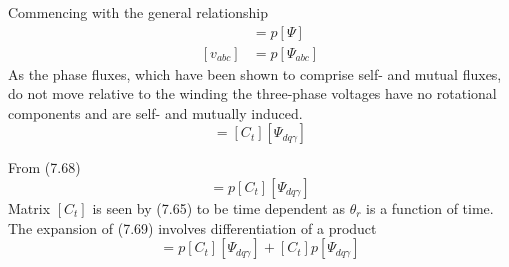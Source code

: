 \documentclass[a4paper,numbers=noenddot,12pt]{scrbook}
\begin{document}
    Commencing with the general relationship
    \begin{align}
        [v] & = p[\varPsi] \nonumber \\
        [v_{abc}] & = p [\varPsi_{abc}]
        \label{eq:Eq7.68}
    \end{align}
    As the phase fluxes, which have been shown to comprise self- and mutual fluxes, do not move relative to the winding the three-phase voltages have no rotational components and are self- and mutually induced.
    \begin{equation*}
        [\varPsi_{abc}] = [C_t] [\varPsi_{dq\gamma}]
    \end{equation*}

    From (7.68)
    \begin{equation}
        [\varPsi_{abc}] = p{[C_t] [\varPsi_{dq\gamma}]}
        \label{eq:Eq7.69}
    \end{equation}
    Matrix $[C_t]$ is seen by (7.65) to be time dependent as $\theta_r$ is a function of time. The expansion of (7.69) involves differentiation of a product
    \begin{equation*}
        [v_{abc}] = {p[C_t]}[\varPsi_{d q \gamma}] + [C_t]{p[\varPsi_{dq\gamma}]}
    \end{equation*}
\end{document}
